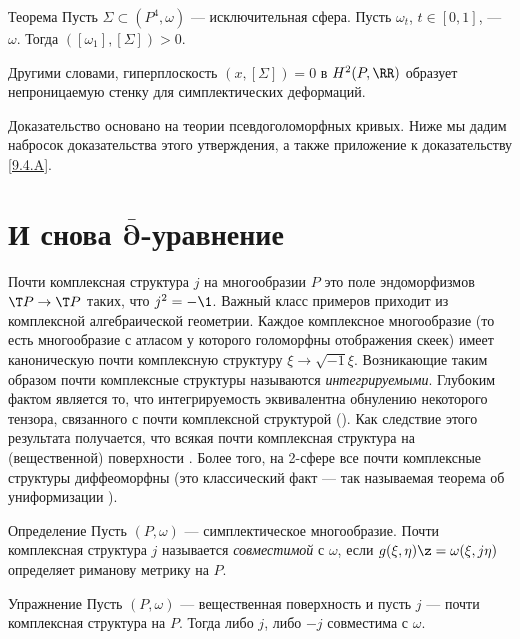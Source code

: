 \begin{thm}{Теорема}\label{10.1.A}
Пусть $\Sigma \subset (P^4, \omega)$ --- исключительная сфера.
Пусть $\omega_t$, $t \in [0, 1]$, ---  $\omega$.
Тогда $([\omega_1 ], [\Sigma]) > 0$.
\end{thm}

Другими словами, гиперплоскость $(x, [\Sigma]) = 0$ в $H^2 (P, \RR)$ образует непроницаемую стенку для симплектических деформаций.

Доказательство основано на теории псевдоголоморфных кривых.
Ниже мы дадим набросок доказательства этого утверждения, а также приложение к доказательству \ref{9.4.A}.

\section[\texorpdfstring{И снова $\bar\partial$-уравнение}{И снова ∂-уравнение}]{И снова $\bm{\bar\partial}$-уравнение}

Почти комплексная структура $j$ на многообразии $P$ это поле эндоморфизмов $\T P \to \T P$ таких, что $j^2 = -\1$.
Важный класс примеров приходит из комплексной алгебраической геометрии.
Каждое комплексное многообразие (то есть многообразие с атласом у которого голоморфны отображения скеек) имеет каноническую почти комплексную структуру $\xi \to \sqrt{-1}\xi$.
Возникающие таким образом почти комплексные структуры называются \emph{интегрируемыми}.
Глубоким фактом является то, что интегрируемость эквивалентна обнулению некоторого тензора, связанного с почти комплексной структурой (\cite{NN}).
Как следствие этого результата получается, что всякая почти комплексная структура на (вещественной) поверхности .
Более того, на 2-сфере все почти комплексные структуры диффеоморфны (это классический факт --- так называемая теорема об униформизации \cite{AS}).

\begin{ex*}{Определение}
Пусть $(P, \omega)$ --- симплектическое многообразие.
Почти комплексная структура $j$ называется \emph{совместимой} с $\omega$, если $g(\xi, \eta) \z= \omega(\xi, j\eta)$ определяет риманову метрику на $P$.
\end{ex*}


\begin{ex}{Упражнение}\label{10.2.A}
Пусть $(P, \omega)$ --- вещественная поверхность и пусть $j$ --- почти комплексная структура на $P$.
Тогда либо $j$, либо $-j$ совместима с $\omega$.
\end{ex}

